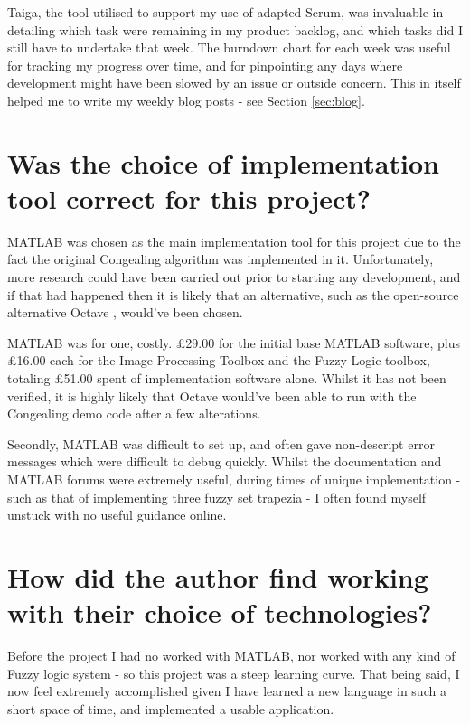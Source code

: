 Taiga, the tool utilised to support my use of adapted-Scrum, was invaluable in detailing which task were remaining in my product backlog, and which tasks did I still have to undertake that week. The burndown chart for each week was useful for tracking my progress over time, and for pinpointing any days where development might have been slowed by an issue or outside concern. This in itself helped me to write my weekly blog posts - see Section \ref{sec:blog}.

\section{Was the choice of implementation tool correct for this project?}

MATLAB was chosen as the main implementation tool for this project due to the fact the original \Gls{Congealing} algorithm was implemented in it. Unfortunately, more research could have been carried out prior to starting any development, and if that had happened then it is likely that an alternative, such as the open-source alternative Octave \cite{octave}, would've been chosen.

MATLAB was for one, costly. \pounds29.00 for the initial base MATLAB software, plus \pounds16.00 each for the Image Processing Toolbox and the Fuzzy Logic toolbox, totaling \pounds51.00 spent of implementation software alone. Whilst it has not been verified, it is highly likely that Octave would've been able to run with the \Gls{Congealing} demo code after a few alterations.

Secondly, MATLAB was difficult to set up, and often gave non-descript error messages which were difficult to debug quickly. Whilst the documentation and MATLAB forums were extremely useful, during times of unique implementation - such as that of implementing three fuzzy set trapezia - I often found myself unstuck with no useful guidance online.

\section{How did the author find working with their choice of technologies?}

Before the project I had no worked with MATLAB, nor worked with any kind of Fuzzy logic system - so this project was a steep learning curve. That being said, I now feel extremely accomplished given I have learned a new language in such a short space of time, and implemented a usable application.

